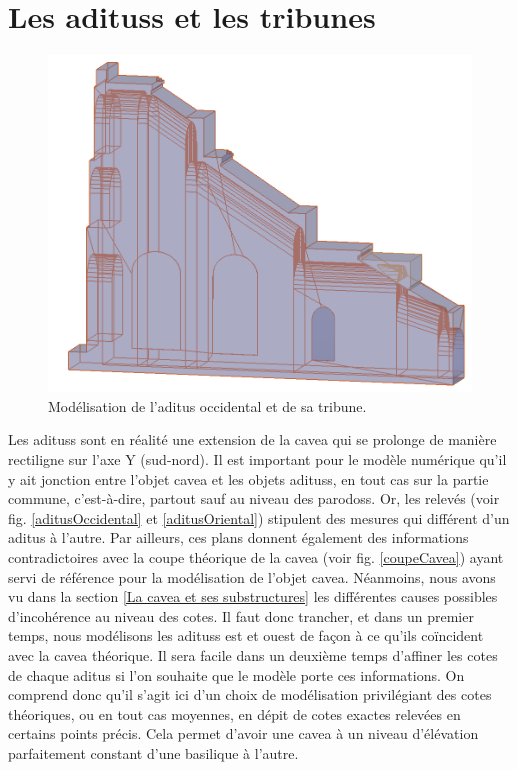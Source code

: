 		
\section{Les \glspl{aditus} et les tribunes} 

\begin{figure}[!h]
\centering
	\includegraphics[width=\linewidth]{images/modAditus}
	\caption{Modélisation de l'\gls{aditus} occidental et de sa tribune.} 
	\label{modAditus} 
\end{figure}  
		
Les \glspl{aditus} sont en réalité une extension de la \gls{cavea} qui se prolonge de manière rectiligne sur l'axe Y (sud-nord). Il est important pour le modèle numérique qu'il y ait jonction entre l'objet \gls{cavea} et les objets \glspl{aditus}, en tout cas sur la partie commune, c'est-à-dire, partout sauf au niveau des \glspl{parodos}. Or, les relevés (voir fig. \ref{aditusOccidental} et \ref{aditusOriental}) stipulent des mesures qui différent d'un \gls{aditus} à l'autre. Par ailleurs, ces plans donnent également des informations contradictoires avec la coupe théorique de la \gls{cavea} (voir fig. \ref{coupeCavea}) ayant servi de référence pour la modélisation de l'objet \gls{cavea}. Néanmoins, nous avons vu dans la section \ref{La cavea et ses substructures} les différentes causes possibles d'incohérence au niveau des cotes. Il faut donc trancher, et dans un premier temps, nous modélisons les \glspl{aditus} est et ouest de façon à ce qu'ils coïncident avec la \gls{cavea} théorique. Il sera facile dans un deuxième temps d'affiner les cotes de chaque  \gls{aditus} si l'on souhaite que le modèle porte ces informations. On comprend donc qu'il s'agit ici d'un choix de modélisation privilégiant des cotes théoriques, ou en tout cas moyennes, en dépit de cotes exactes relevées en certains points précis. Cela permet d'avoir une \gls{cavea} à un niveau d'élévation parfaitement constant d'une \gls{basilique} à l'autre. 

